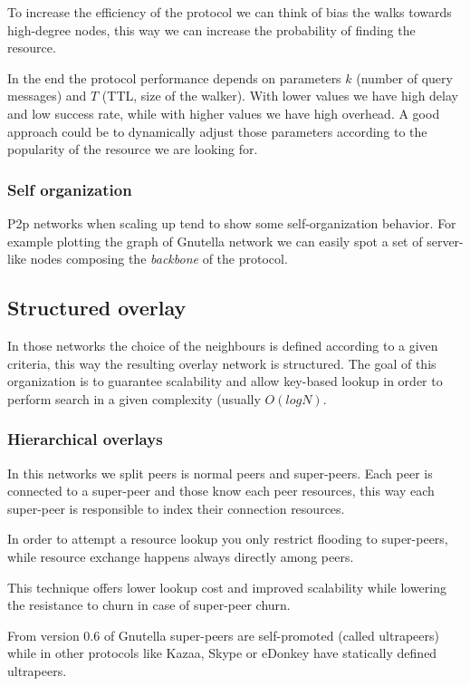 To increase the efficiency of the protocol we can think of bias the walks towards high-degree nodes, this way we can increase the probability of finding the resource.

In the end the protocol performance depends on parameters $k$ (number of query messages) and $T$ (TTL, size of the walker).
With lower values we have high delay and low success rate, while with higher values we have high overhead.
A good approach could be to dynamically adjust those parameters according to the popularity of the resource we are looking for.

\subsubsection{Self organization}
P2p networks when scaling up tend to show some self-organization behavior.
For example plotting the graph of Gnutella network we can easily spot a set of server-like nodes composing the \emph{backbone} of the protocol.

\subsection{Structured overlay}
In those networks the choice of the neighbours is defined according to a given criteria, this way the resulting overlay network is structured.
The goal of this organization is to guarantee scalability and allow key-based lookup in order to perform search in a given complexity (usually $O(log N)$.

\subsubsection{Hierarchical overlays}
In this networks we split peers is normal peers and super-peers.
Each peer is connected to a super-peer and those know each peer resources, this way each super-peer is responsible to index their connection resources.

In order to attempt a resource lookup you only restrict flooding to super-peers, while resource exchange happens always directly among peers.

This technique offers lower lookup cost and improved scalability while lowering the resistance to churn in case of super-peer churn.

From version 0.6 of Gnutella super-peers are self-promoted (called ultrapeers) while in other protocols like Kazaa, Skype or eDonkey have statically defined ultrapeers. 


